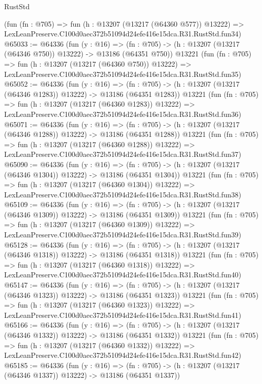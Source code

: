 \begin{lexlean}{RustStd}
\begin{coremodule}
    (fun (fn : @705) =>
    fun (h : @13207 (@13217 (@64360 @577)) @13222) =>
    LexLeanPreserve.C100d0aec372b51094d24efe416e15dca.R31.RustStd.fun34)
@65033 := @64336
    (fun (y : @16) =>
    (fn : @705) -> (h : @13207 (@13217 (@64346 @750)) @13222) -> @13186 (@64351 @750))
    @13221
    (fun (fn : @705) =>
    fun (h : @13207 (@13217 (@64360 @750)) @13222) =>
    LexLeanPreserve.C100d0aec372b51094d24efe416e15dca.R31.RustStd.fun35)
@65052 := @64336
    (fun (y : @16) =>
    (fn : @705) -> (h : @13207 (@13217 (@64346 @1283)) @13222) -> @13186 (@64351 @1283))
    @13221
    (fun (fn : @705) =>
    fun (h : @13207 (@13217 (@64360 @1283)) @13222) =>
    LexLeanPreserve.C100d0aec372b51094d24efe416e15dca.R31.RustStd.fun36)
@65071 := @64336
    (fun (y : @16) =>
    (fn : @705) -> (h : @13207 (@13217 (@64346 @1288)) @13222) -> @13186 (@64351 @1288))
    @13221
    (fun (fn : @705) =>
    fun (h : @13207 (@13217 (@64360 @1288)) @13222) =>
    LexLeanPreserve.C100d0aec372b51094d24efe416e15dca.R31.RustStd.fun37)
@65090 := @64336
    (fun (y : @16) =>
    (fn : @705) -> (h : @13207 (@13217 (@64346 @1304)) @13222) -> @13186 (@64351 @1304))
    @13221
    (fun (fn : @705) =>
    fun (h : @13207 (@13217 (@64360 @1304)) @13222) =>
    LexLeanPreserve.C100d0aec372b51094d24efe416e15dca.R31.RustStd.fun38)
@65109 := @64336
    (fun (y : @16) =>
    (fn : @705) -> (h : @13207 (@13217 (@64346 @1309)) @13222) -> @13186 (@64351 @1309))
    @13221
    (fun (fn : @705) =>
    fun (h : @13207 (@13217 (@64360 @1309)) @13222) =>
    LexLeanPreserve.C100d0aec372b51094d24efe416e15dca.R31.RustStd.fun39)
@65128 := @64336
    (fun (y : @16) =>
    (fn : @705) -> (h : @13207 (@13217 (@64346 @1318)) @13222) -> @13186 (@64351 @1318))
    @13221
    (fun (fn : @705) =>
    fun (h : @13207 (@13217 (@64360 @1318)) @13222) =>
    LexLeanPreserve.C100d0aec372b51094d24efe416e15dca.R31.RustStd.fun40)
@65147 := @64336
    (fun (y : @16) =>
    (fn : @705) -> (h : @13207 (@13217 (@64346 @1323)) @13222) -> @13186 (@64351 @1323))
    @13221
    (fun (fn : @705) =>
    fun (h : @13207 (@13217 (@64360 @1323)) @13222) =>
    LexLeanPreserve.C100d0aec372b51094d24efe416e15dca.R31.RustStd.fun41)
@65166 := @64336
    (fun (y : @16) =>
    (fn : @705) -> (h : @13207 (@13217 (@64346 @1332)) @13222) -> @13186 (@64351 @1332))
    @13221
    (fun (fn : @705) =>
    fun (h : @13207 (@13217 (@64360 @1332)) @13222) =>
    LexLeanPreserve.C100d0aec372b51094d24efe416e15dca.R31.RustStd.fun42)
@65185 := @64336
    (fun (y : @16) =>
    (fn : @705) -> (h : @13207 (@13217 (@64346 @1337)) @13222) -> @13186 (@64351 @1337))

\end{coremodule}
\end{lexlean}
